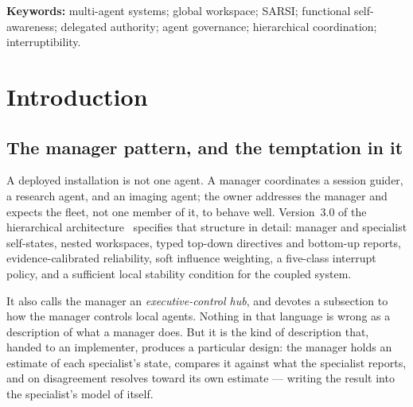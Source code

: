 \documentclass[11pt]{article}
\begin{document}
\begin{abstract}
Three further results follow in the base paper's vocabulary. A manager's claim about a specialist is model inference on the evidence ladder, outranked by that specialist's own instrumentation, so a manager cannot certify a competence it does not measure. Delegated authority is an intersection rather than a union, closing a laundering route by which a fleet's effective authority becomes that of its most privileged member. And an owner interrupt may pause but never edit, because a state-writing interrupt is --- from inside the affected agent --- indistinguishable from the confabulation the evidence ladder exists to rule out.
\end{abstract}

\vspace{2pt}
\noindent\textbf{Keywords:} multi-agent systems; global workspace; SARSI; functional self-awareness; delegated authority; agent governance; hierarchical coordination; interruptibility.

\tableofcontents
\newpage

\section{Introduction}
\label{sec:intro}

\subsection{The manager pattern, and the temptation in it}

A deployed installation is not one agent. A manager coordinates a session guider, a research agent, and an imaging agent; the owner addresses the manager and expects the fleet, not one member of it, to behave well. Version~3.0 of the hierarchical architecture~\citep{yang2026hierarchical} specifies that structure in detail: manager and specialist self-states, nested workspaces, typed top-down directives and bottom-up reports, evidence-calibrated reliability, soft influence weighting, a five-class interrupt policy, and a sufficient local stability condition for the coupled system.

It also calls the manager an \emph{executive-control hub}, and devotes a subsection to how the manager controls local agents. Nothing in that language is wrong as a description of what a manager does. But it is the kind of description that, handed to an implementer, produces a particular design: the manager holds an estimate of each specialist's state, compares it against what the specialist reports, and on disagreement resolves toward its own estimate --- writing the result into the specialist's model of itself.
\end{document}
